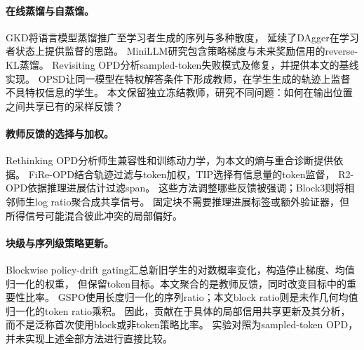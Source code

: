 \paragraph{在线蒸馏与自蒸馏。}
GKD将语言模型蒸馏推广至学习者生成的序列与多种散度\citep{gkd}，
延续了DAgger在学习者状态上提供监督的思路\citep{dagger}。
MiniLLM研究包含策略梯度与未来奖励信用的reverse-KL蒸馏\citep{minillm}。
Revisiting OPD分析sampled-token失败模式及修复，并提供本文的基线实现\citep{revisiting}。
OPSD让同一模型在特权解答条件下形成教师，在学生生成的轨迹上监督不具特权信息的学生\citep{opsd}。
本文保留独立冻结教师，研究不同问题：如何在输出位置之间共享已有的采样反馈？

\paragraph{教师反馈的选择与加权。}
Rethinking OPD分析师生兼容性和训练动力学，为本文的熵与重合诊断提供依据\citep{rethinking}。
FiRe-OPD结合轨迹过滤与token加权，TIP选择有信息量的token监督，
R2-OPD依据推理进展估计过滤span\citep{fireopd,tip,r2opd}。
这些方法调整哪些反馈被强调；Block3则将相邻师生log ratio聚合成共享信号。
固定块不需要推理进展标签或额外验证器，但所得信号可能混合彼此冲突的局部偏好。

\paragraph{块级与序列级策略更新。}
Blockwise policy-drift gating汇总新旧学生的对数概率变化，构造停止梯度、均值归一化的权重，
但保留token目标\citep{bpdg}。本文聚合的是教师反馈，同时改变目标中的重要性比率。
GSPO使用长度归一化的序列ratio\citep{gspo}；本文block ratio则是未作几何均值归一化的token ratio乘积。
因此，贡献在于具体的局部信用共享更新及其分析，而不是泛称首次使用block或非token策略比率。
实验对照为sampled-token OPD，并未实现上述全部方法进行直接比较。
